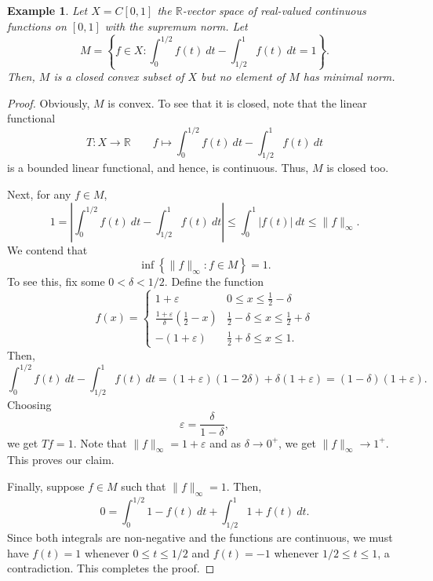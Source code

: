 \documentclass[11pt]{article}
\theoremstyle{thmstyle}
\theoremstyle{defstyle}
\newtheorem{example}[theorem]{Example}
\newcommand{\R}{\mathbb{R}}
\renewcommand{\le}{\leqslant}
\begin{document}
\begin{example}
    Let $X = C[0, 1]$ the $\R$-vector space of real-valued continuous functions on $[0, 1]$ with the supremum norm. Let 
    \begin{equation*}
        M = \left\{f\in X\colon \int_0^{1/2} f(t)~dt - \int_{1/2}^1 f(t)~dt = 1\right\}.
    \end{equation*}
    Then, $M$ is a closed convex subset of $X$ but no element of $M$ has minimal norm.
\end{example}
\begin{proof}
    Obviously, $M$ is convex. To see that it is closed, note that the linear functional 
    \begin{equation*}
        T: X\to\R\qquad f\mapsto \int_0^{1/2} f(t)~dt - \int_{1/2}^1 f(t)~dt
    \end{equation*}
    is a bounded linear functional, and hence, is continuous. Thus, $M$ is closed too.

    Next, for any $f\in M$,
    \begin{equation*}
        1 = \left|\int_0^{1/2} f(t)~dt - \int_{1/2}^1 f(t)~dt\right|\le\int_0^1|f(t)|~dt\le \|f\|_\infty.
    \end{equation*}
    We contend that 
    \begin{equation*}
        \inf\left\{\|f\|_\infty\colon f\in M\right\} = 1.
    \end{equation*}
    To see this, fix some $0 < \delta < 1/2$. Define the function 
    \begin{equation*}
        f(x) = 
        \begin{cases}
            1 + \varepsilon & 0\le x\le \frac{1}{2} - \delta\\
            \frac{1 + \varepsilon}{\delta}\left(\frac{1}{2} - x\right) & \frac{1}{2} - \delta\le x\le \frac{1}{2} + \delta\\
            -(1 + \varepsilon) & \frac{1}{2} + \delta\le x\le 1.
        \end{cases}
    \end{equation*}
    Then,
    \begin{equation*}
        \int_0^{1/2} f(t)~dt - \int_{1/2}^1 f(t)~dt = (1 + \varepsilon)(1 - 2\delta) + \delta(1 + \varepsilon) = (1 - \delta)(1 + \varepsilon).
    \end{equation*}
    Choosing 
    \begin{equation*}
        \varepsilon = \frac{\delta}{1 - \delta},
    \end{equation*}
    we get $Tf = 1$. Note that $\|f\|_\infty = 1 + \varepsilon$ and as $\delta\to 0^+$, we get $\|f\|_\infty\to 1^+$. This proves our claim.

    Finally, suppose $f\in M$ such that $\|f\|_\infty = 1$. Then, 
    \begin{equation*}
        0 = \int_{0}^{1/2}1 - f(t)~dt + \int_{1/2}^1 1 + f(t)~dt.
    \end{equation*}
    Since both integrals are non-negative and the functions are continuous, we must have $f(t) = 1$ whenever $0\le t\le 1/2$ and $f(t) = -1$ whenever $1/2\le t\le 1$, a contradiction. This completes the proof.
\end{proof}
\end{document}
